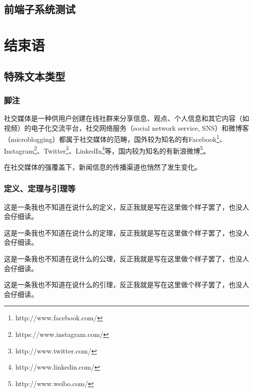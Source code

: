 \documentclass[a4paper,AutoFakeBold,oneside,12pt]{book}
\begin{document}
\section{前端子系统测试}

\chapter{结束语}



\section{特殊文本类型}
\subsection{脚注}
社交媒体是一种供用户创建在线社群来分享信息、观点、个人信息和其它内容（如视频）的电子化交流平台，社交网络服务（social network service, SNS）和微博客（microblogging）都属于社交媒体的范畴\cite{webster_social_media}，国外较为知名的有Facebook\footnote{http://www.facebook.com/}、Instagram\footnote{https://www.instagram.com/}、Twitter\footnote{http://www.twitter.com/}、LinkedIn\footnote{http://www.linkedin.com/}等，国内较为知名的有新浪微博\footnote{http://www.weibo.com/}。

在社交媒体的强覆盖下，新闻信息的传播渠道也悄然了发生变化。\cite{false_news_spread_2018}

\subsection{定义、定理与引理等}
\begin{definition}
	这是一条我也不知道在说什么的定义，反正我就是写在这里做个样子罢了，也没人会仔细读。\cite{周兴2017基于深度学习的谣言检测及模式挖掘}
\end{definition}

\begin{theorem}
	这是一条我也不知道在说什么的定理，反正我就是写在这里做个样子罢了，也没人会仔细读。
\end{theorem}

\begin{axiom}
	这是一条我也不知道在说什么的公理，反正我就是写在这里做个样子罢了，也没人会仔细读。
\end{axiom}

\begin{lemma}
	这是一条我也不知道在说什么的引理，反正我就是写在这里做个样子罢了，也没人会仔细读。
\end{lemma}
\end{document}
